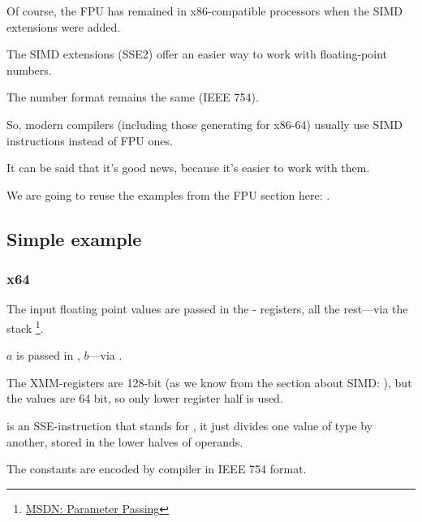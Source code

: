 
\label{floating_SIMD}

Of course, the \ac{FPU} has remained in x86-compatible processors when the \ac{SIMD} extensions were added.

The \ac{SIMD} extensions (SSE2) offer an easier way to work with floating-point numbers.

The number format remains the same (IEEE 754).

So, modern compilers (including those generating
for x86-64) usually use \ac{SIMD} instructions instead of FPU ones.

It can be said that it's good news, because it's easier to work with them.

We are going to reuse the examples from the FPU section here: .

\subsection{Simple example}



\subsubsection{x64}



The input floating point values are passed in the - registers,
all the rest---via the stack
\footnote{\href{http://go.yurichev.com/17263}{MSDN: Parameter Passing}}.

$a$ is passed in , $b$---via .

The XMM-registers are 128-bit (as we know from the section about \ac{SIMD}: ), 
but the \Tdouble values are 64 bit, so only lower register half is used.

 is an SSE-instruction that stands for 
, 
it just divides
one value of type \Tdouble by another, stored in the lower halves of operands.

The constants are encoded by compiler in IEEE 754 format.

